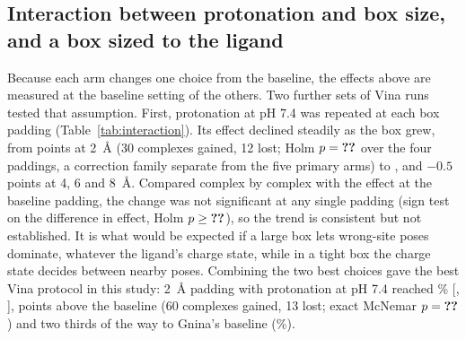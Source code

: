\subsection{Interaction between protonation and box size, and a box sized to the ligand}
\label{sec:interaction}

Because each arm changes one choice from the baseline, the effects above are measured at
the baseline setting of the others. Two further sets of Vina runs tested that assumption.
First, protonation at pH 7.4 was repeated at each box padding (Table~\ref{tab:interaction}).
Its effect declined steadily as the box grew, from  points at \SI{2}{\angstrom} (30
complexes gained, 12 lost; Holm $p = \val{followup_interaction/2/p_holm}$ over the four paddings, a correction family
separate from the five primary arms) to ,  and
$-0.5$ points at 4, 6 and \SI{8}{\angstrom}. Compared complex by complex with the effect at
the baseline padding, the change was not significant at any single padding (sign test on
the difference in effect, Holm $p \ge \val{followup_interaction/8/vs_baseline_padding_p_holm}$), so the trend is consistent but not
established. It is what would be expected if a large box lets wrong-site poses dominate,
whatever the ligand's charge state, while in a tight box the charge state decides between
nearby poses. Combining the two best choices gave the best Vina protocol in this study:
\SI{2}{\angstrom} padding with protonation at pH 7.4 reached \% [, ], 
points above the baseline (60 complexes gained, 13 lost; exact McNemar
$p = \val{followup_combined/box_padding_2+ligand_dimorphite/p}$) and two thirds of the way to Gnina's baseline (\%).

